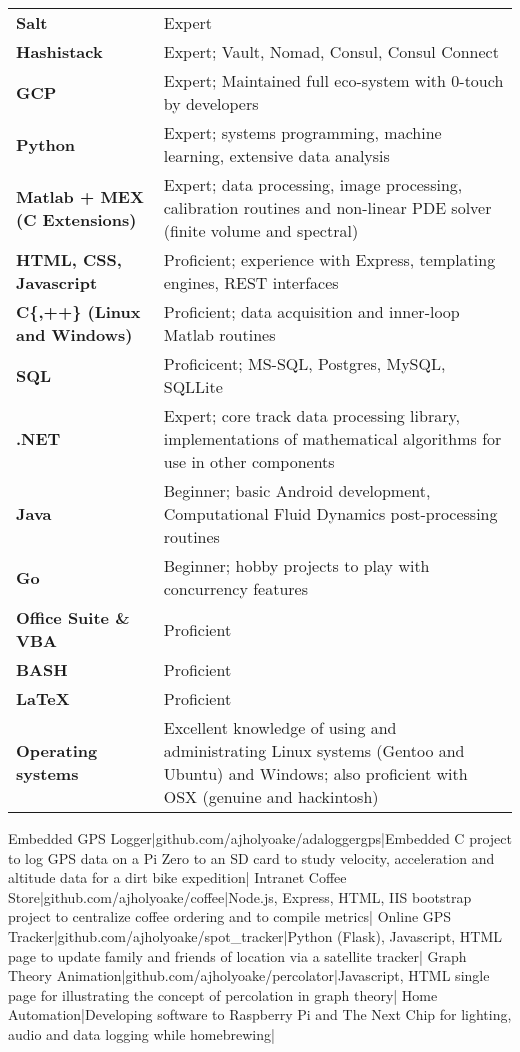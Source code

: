 \documentclass[a4paper,10pt]{article}
\begin{document}
\begin{tabular}{p{2.8in}p{3.3in}}
\textbf{Salt} & Expert \\
\textbf{Hashistack} & Expert; Vault, Nomad, Consul, Consul Connect \\
\textbf{GCP} & Expert; Maintained full eco-system with 0-touch by developers\\
\textbf{Python} & Expert; systems programming, machine learning, extensive data analysis \\
\textbf{Matlab + MEX (C Extensions)} & Expert; data processing, image processing, calibration routines and non-linear PDE solver (finite volume and spectral)\\
\textbf{HTML, CSS, Javascript} & Proficient; experience with Express, templating engines, REST interfaces\\
\textbf{C\{,++\} (Linux and Windows)}     & Proficient; data acquisition and inner-loop Matlab routines\\
\textbf{SQL} & Proficicent; MS-SQL, Postgres, MySQL, SQLLite \\
\textbf{.NET} & Expert; core track data processing library, implementations of mathematical algorithms for use in other components \\
\textbf{Java} & Beginner; basic Android development, Computational Fluid Dynamics post-processing routines\\
\textbf{Go} & Beginner; hobby projects to play with concurrency features\\
\textbf{Office Suite \& VBA} & Proficient\\
\textbf{BASH}   & Proficient\\
\textbf{\LaTeX} & Proficient\\
  \textbf{Operating systems} & Excellent knowledge of using and administrating Linux systems (Gentoo and Ubuntu) and Windows; also proficient with OSX (genuine and hackintosh)\\
\end{tabular}
\newline
\lineunder

\begin{2colsection}
\Rcc Embedded GPS Logger|github.com/ajholyoake/adaloggergps|Embedded C project
to log GPS data on a Pi Zero to an SD card to study velocity, acceleration and
altitude data for a dirt bike expedition|
\Rcc Intranet Coffee Store|github.com/ajholyoake/coffee|Node.js, Express, HTML, IIS
bootstrap project to centralize coffee ordering and to compile metrics|
\Rcc Online GPS Tracker|github.com/ajholyoake/spot\_tracker|Python (Flask),
Javascript, HTML page to update family and friends of location via a satellite tracker|
\Rcc Graph Theory Animation|github.com/ajholyoake/percolator|Javascript, HTML
single page for illustrating the concept of percolation in graph theory|
\Rc Home Automation|Developing software to Raspberry Pi and The Next Chip for
lighting, audio and data logging while homebrewing|
\end{2colsection}
\end{document}
